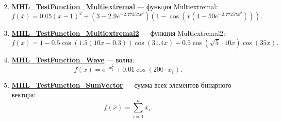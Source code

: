\begin{enumerate}
\begin{equation}
 \end{equation}
 \item \hyperref[TestFunctions:section:MHL_TestFunction_Multiextremal]{\textbf{MHL\_TestFunction\_Multiextremal}} --- функция Multiextremal:
 \begin{equation}
 f\left( \bar{x}\right) = 0.05\left( x-1\right)^2 + \left( 3-2.9e^{-2.77257x^2}\right)\left( 1-\cos\left(x\left(4-50e^{-2.77257x^2} \right)  \right) \right).
 \end{equation}
 \item \hyperref[TestFunctions:section:MHL_TestFunction_Multiextremal2]{\textbf{MHL\_TestFunction\_Multiextremal2}} --- функция Multiextremal2:
 \begin{equation}
 f\left( \bar{x}\right) =1-0.5\cos\left( 1.5\left( 10x-0.3\right) \right)\cos\left( 31.4x\right)+0.5\cos\left(\sqrt{5}\cdot10x \right)\cos\left( 35x\right). 
 \end{equation}
 \item \hyperref[TestFunctions:section:MHL_TestFunction_Wave]{\textbf{MHL\_TestFunction\_Wave}} --- волна:
 \begin{equation}
 f\left( \bar{x}\right) = e^{ -\bar{x}_1^2}+0.01\cos\left( 200\cdot\bar{x}_1\right).
 \end{equation}
 \item \hyperref[TestFunctions:section:MHL_TestFunction_SumVector]{\textbf{MHL\_TestFunction\_SumVector}} --- сумма всех элементов бинарного вектора:
 \begin{equation}
 f\left( \bar{x}\right) = \sum_{i=1}^{n}\bar{x}_i.
 \end{equation}
 \end{enumerate}